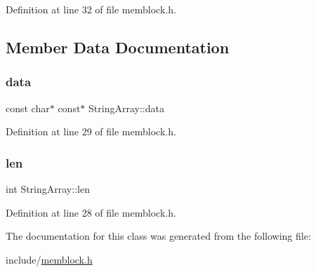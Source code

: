 Definition at line 32 of file memblock.\+h.



\subsection{Member Data Documentation}
\mbox{\label{class_string_array_a025f3f4f9a33f02b15e472782137d4ba}} 
\subsubsection{\texorpdfstring{data}{data}}
{\footnotesize\ttfamily const char$\ast$ const$\ast$ String\+Array\+::data}



Definition at line 29 of file memblock.\+h.

\mbox{\label{class_string_array_a55666d8937557c4f6f0c9ac4a1c16194}} 
\subsubsection{\texorpdfstring{len}{len}}
{\footnotesize\ttfamily int String\+Array\+::len}



Definition at line 28 of file memblock.\+h.



The documentation for this class was generated from the following file\+:\begin{DoxyCompactItemize}
\item 
include/\hyperlink{memblock_8h}{memblock.\+h}\end{DoxyCompactItemize}
